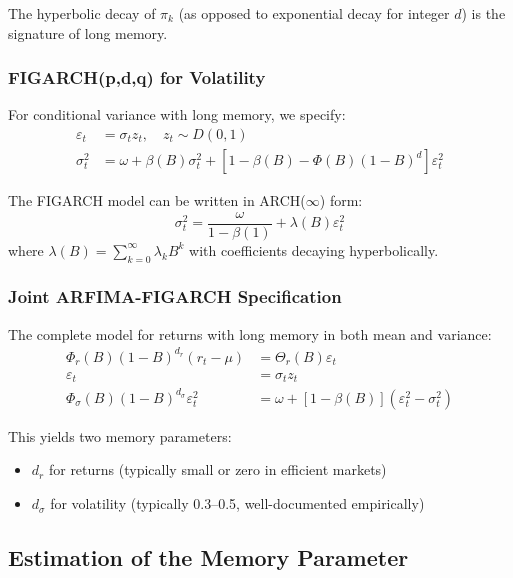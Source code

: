 \documentclass[11pt,a4paper]{article}
\theoremstyle{definition}
\begin{document}
The hyperbolic decay of $\pi_k$ (as opposed to exponential decay for integer $d$) is the signature of long memory.

\subsubsection{FIGARCH(p,d,q) for Volatility}

For conditional variance with long memory, we specify:
\begin{align}
    \varepsilon_t &= \sigma_t z_t, \quad z_t \sim D(0,1) \\
    \sigma_t^2 &= \omega + \beta(B)\sigma_t^2 + \left[1 - \beta(B) - \Phi(B)(1-B)^d\right]\varepsilon_t^2
\end{align}

The FIGARCH model can be written in ARCH($\infty$) form:
\begin{equation}
    \sigma_t^2 = \frac{\omega}{1-\beta(1)} + \lambda(B)\varepsilon_t^2
\end{equation}
where $\lambda(B) = \sum_{k=0}^{\infty} \lambda_k B^k$ with coefficients decaying hyperbolically.

\subsubsection{Joint ARFIMA-FIGARCH Specification}

The complete model for returns with long memory in both mean and variance:
\begin{align}
    \Phi_r(B)(1-B)^{d_r} (r_t - \mu) &= \Theta_r(B)\varepsilon_t \label{eq:arfima_mean}\\
    \varepsilon_t &= \sigma_t z_t \\
    \Phi_\sigma(B)(1-B)^{d_\sigma} \varepsilon_t^2 &= \omega + [1-\beta(B)](\varepsilon_t^2 - \sigma_t^2) \label{eq:figarch_var}
\end{align}

This yields two memory parameters:
\begin{itemize}
    \item $d_r$ for returns (typically small or zero in efficient markets)
    \item $d_\sigma$ for volatility (typically 0.3--0.5, well-documented empirically)
\end{itemize}

\subsection{Estimation of the Memory Parameter}
\end{document}
